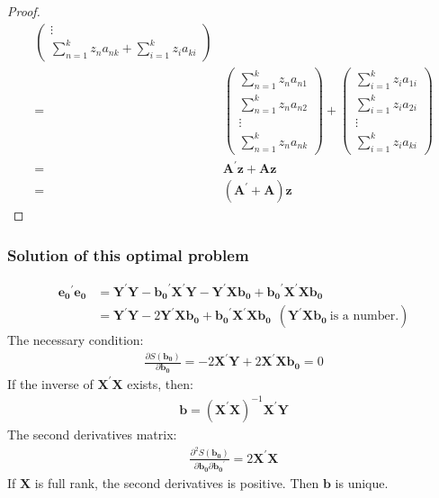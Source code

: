 \documentclass{article}
\begin{document}
\begin{proof}
\begin{align*}
\begin{pmatrix}
					\vdots\\
					\sum\limits^k_{n=1} z_n a_{nk} + \sum\limits^k_{i=1} z_i a_{ki} 
				\end{pmatrix}\\ = &
				\begin{pmatrix}
					\sum\limits^k_{n=1} z_n a_{n1}\\
					\sum\limits^k_{n=1} z_n a_{n2}\\
					\vdots\\
					\sum\limits^k_{n=1} z_n a_{nk}
				\end{pmatrix} + 
				\begin{pmatrix}
					\sum\limits^k_{i=1} z_i a_{1i}\\
					\sum\limits^k_{i=1} z_i a_{2i}\\
					\vdots\\
					\sum\limits^k_{i=1} z_i a_{ki}
				\end{pmatrix}\\ = &
				 \boldsymbol{A}^\prime \boldsymbol{z} + \boldsymbol{A} \boldsymbol{z}\\ = &
				 (\boldsymbol{A}^\prime + \boldsymbol{A}) \boldsymbol{z}
			\end{align*}
	\end{proof}

\subsubsection{Solution of this optimal problem}
	\begin{align*}
		\boldsymbol{e_0}^\prime \boldsymbol{e_0} &= \boldsymbol{Y}^\prime \boldsymbol{Y} - \boldsymbol{b_0}^\prime \boldsymbol{X}^\prime \boldsymbol{Y} - \boldsymbol{Y}^\prime \boldsymbol{X} \boldsymbol{b_0} + \boldsymbol{b_0}^\prime \boldsymbol{X}^\prime \boldsymbol{X} \boldsymbol{b_0}\\
		&= \boldsymbol{Y}^\prime \boldsymbol{Y} - 2 \boldsymbol{Y}^\prime \boldsymbol{X} \boldsymbol{b_0} + \boldsymbol{b_0}^\prime \boldsymbol{X}^\prime \boldsymbol{X} \boldsymbol{b_0}\ \  (\boldsymbol{Y}^\prime \boldsymbol{X} \boldsymbol{b_0}\ \text{is a number.})
	\end{align*}
The necessary condition:
	\begin{align*}
		\frac{\partial S(\boldsymbol{b_0})}{\partial \boldsymbol{b_0}} = -2 \boldsymbol{X}^\prime \boldsymbol{Y} + 2 \boldsymbol{X}^\prime \boldsymbol{X} \boldsymbol{b_0} = 0
	\end{align*}
If the inverse of $\boldsymbol{X}^\prime \boldsymbol{X}$ exists, then:
	\begin{align*}
		\boldsymbol{b} = (\boldsymbol{X}^\prime \boldsymbol{X})^{-1} \boldsymbol{X}^\prime \boldsymbol{Y}
	\end{align*}
The second derivatives matrix:
	\begin{align*}
		\frac{\partial^2 S(\boldsymbol{b_0})}{\partial \boldsymbol{b_0} \partial \boldsymbol{b_0}^\prime} = 2 \boldsymbol{X^\prime} \boldsymbol{X}
	\end{align*}
If $\boldsymbol{X}$ is full rank, the second derivatives is positive. Then $\boldsymbol{b}$ is unique.
\end{document}
